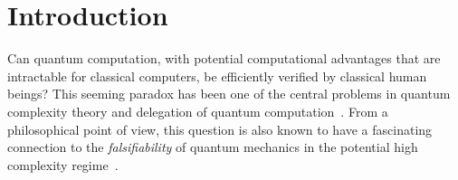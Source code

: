 \section{Introduction}
Can quantum computation, with potential computational advantages that are intractable for classical computers,
be efficiently verified by classical human beings?
This seeming paradox has been one of the central problems in quantum complexity theory and delegation of quantum computation~\cite{web:Aaronson}.
From a philosophical point of view, this question is also known to have a fascinating connection to the \emph{falsifiability} of quantum mechanics in the potential high complexity regime~\cite{survey:AV12}.

